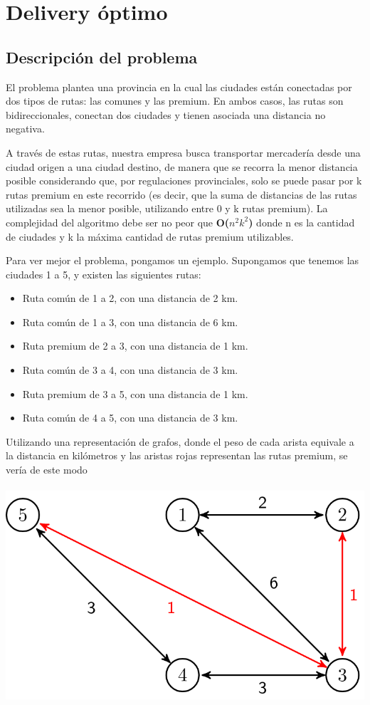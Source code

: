 \section{Delivery óptimo}

\subsection{Descripción del problema}
El problema plantea una provincia en la cual las ciudades están conectadas por dos tipos de rutas: las comunes y las premium. En ambos casos, las rutas son bidireccionales, conectan dos ciudades y tienen asociada una distancia no negativa.
\\
\par
A través de estas rutas, nuestra empresa busca transportar mercadería desde una ciudad origen a una ciudad destino, de manera que se recorra la menor distancia posible considerando que, por regulaciones provinciales, solo se puede pasar por k rutas premium en este recorrido (es decir, que la suma de distancias de las rutas utilizadas sea la menor posible, utilizando entre 0 y k rutas premium). La complejidad del algoritmo debe ser no peor que \textbf{O($n^2k^2$)} donde n es la cantidad de ciudades y k la máxima cantidad de rutas premium utilizables.
\\
\par
Para ver mejor el problema, pongamos un ejemplo. Supongamos que tenemos las ciudades 1 a 5, y existen las siguientes rutas:
\begin{itemize}
\item Ruta común de 1 a 2, con una distancia de 2 km.
\item Ruta común de 1 a 3, con una distancia de 6 km.
\item Ruta premium de 2 a 3, con una distancia de 1 km.
\item Ruta común de 3 a 4, con una distancia de 3 km.
\item Ruta premium de 3 a 5, con una distancia de 1 km.
\item Ruta común de 4 a 5, con una distancia de 3 km.
\end{itemize}
Utilizando una representación de grafos, donde el peso de cada arista equivale a la distancia en kilómetros y las aristas rojas representan las rutas premium, se vería de este modo
\\
\\
\includegraphics[scale=0.25]{imagenes/ejemplo1.png}
